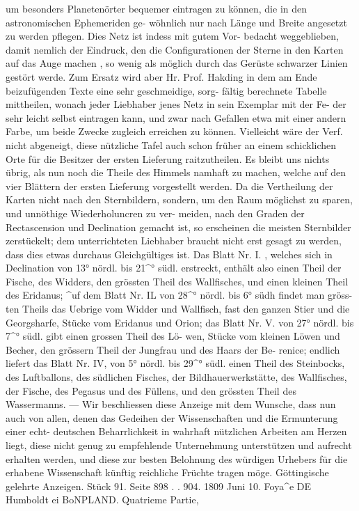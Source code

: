 \documentclass[12pt,a4paper]{article}
\begin{document}
um  besonders  Planetenörter  bequemer  eintragen  zu  können,  die  in  den  astronomischen  Ephemeriden  ge- wöhnlich nur  nach  Länge  und  Breite  angesetzt  zu  werden  pflegen.  Dies  Netz  ist  indess  mit  gutem  Vor- bedacht weggeblieben,  damit  nemlich  der  Eindruck,  den  die  Configurationen  der  Sterne  in  den  Karten auf  das  Auge  machen ,  so  wenig  als  möglich  durch  das  Gerüste  schwarzer  Linien  gestört  werde.  Zum Ersatz  wird  aber  Hr.  Prof.  Hakding  in  dem  am  Ende  beizufügenden  Texte  eine  sehr  geschmeidige,  sorg- fältig berechnete  Tabelle  mittheilen,  wonach  jeder  Liebhaber  jenes  Netz  in  sein  Exemplar  mit  der  Fe- der sehr  leicht  selbst  eintragen  kann,  und  zwar  nach  Gefallen  etwa  mit  einer  andern  Farbe,  um  beide Zwecke  zugleich  erreichen  zu  können.  Vielleicht  wäre  der  Verf.  nicht  abgeneigt,  diese  nützliche  Tafel auch  schon  früher  an  einem  schicklichen  Orte  für  die  Besitzer  der  ersten  Lieferung  raitzutheilen. Es  bleibt  uns  nichts  übrig,  als  nun  noch  die  Theile  des  Himmels  namhaft  zu  machen,  welche  auf den  vier  Blättern  der  ersten  Lieferung  vorgestellt  werden.  Da  die  Vertheilung  der  Karten  nicht  nach den  Sternbildern,  sondern,  um  den  Raum  möglichst  zu  sparen,  und  unnöthige  Wiederholuncren  zu  ver- meiden,  nach  den  Graden  der  Rectascension  und  Declination  gemacht  ist,  so  erscheinen  die  meisten Sternbilder  zerstückelt;  dem  unterrichteten  Liebhaber  braucht  nicht  erst  gesagt  zu  werden,  dass  dies etwas  durchaus  Gleichgültiges  ist.  Das  Blatt  Nr.  I. ,  welches  sich  in  Declination  von  13°  nördl.  bis  21\textasciicircum{}° südl.  erstreckt,  enthält  also  einen  Theil  der  Fische,  des  Widders,  den  grössten  Theil  des  Wallfisches, und  einen  kleinen  Theil  des  Eridanus;  \textasciicircum{}uf  dem  Blatt  Nr.  IL  von  28\textasciicircum{}°  nördl.  bis  6°  südh  findet  man  gröss- ten Theils  das  Uebrige  vom  Widder  und  Wallfisch,  fast  den  ganzen  Stier  und  die  Georgsharfe,  Stücke vom  Eridanus  und  Orion;  das  Blatt  Nr.  V.  von  27°  nördl.  bis  7\textasciicircum{}°  südl.  gibt  einen  grossen  Theil  des  Lö- wen, Stücke  vom  kleinen  Löwen  und  Becher,  den  grössern  Theil  der  Jungfrau  und  des  Haars  der  Be- renice;  endlich  liefert  das  Blatt  Nr.  IV,  von  5°  nördl.  bis  29\textasciicircum{}°  südl.  einen  Theil  des  Steinbocks,  des Luftballons,  des  südlichen  Fisches,  der  Bildhauerwerkstätte,  des  Wallfisches,  der  Fische,  des  Pegasus und  des  Füllens,  und  den  grössten  Theil  des  Wassermanns.  ---  Wir  beschliessen  diese  Anzeige  mit  dem Wunsche,  dass  nun  auch  von  allen,  denen  das  Gedeihen  der  Wissenschaften  und  die  Ermunterung  einer echt- deutschen  Beharrlichkeit  in  wahrhaft  nützlichen  Arbeiten  am  Herzen  liegt,  diese  nicht  genug  zu empfehlende  Unternehmung  unterstützen  und  aufrecht  erhalten  werden,  und  diese  zur  besten  Belohnung des  würdigen  Urhebers  für  die  erhabene  Wissenschaft  künftig  reichliche  Früchte  tragen  möge. Göttingische  gelehrte  Anzeigen.     Stück  91.     Seite  898  .  .  904.     1809  Juni  10. Foya\textasciicircum{}e  DE  Humboldt  ei  BoNPLAND.  Quatrieme  Partie,  
\end{document}
